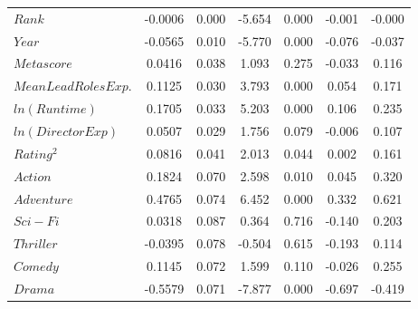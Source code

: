 \begin{table}[H]
\begin{center}
\begin{tabular}{lcccccc}
                        \textbf{$Rank$}                 & -0.0006       & 0.000            & -5.654     & 0.000               & -0.001          & -0.000          \\
                        \textbf{$Year$}                 & -0.0565       & 0.010            & -5.770     & 0.000               & -0.076          & -0.037          \\
                        \textbf{$Metascore$}            & 0.0416        & 0.038            & 1.093      & 0.275               & -0.033          & 0.116           \\
                        \textbf{$Mean Lead Roles Exp.$} & 0.1125        & 0.030            & 3.793      & 0.000               & 0.054           & 0.171           \\
                        \textbf{$ln(Runtime)$}          & 0.1705        & 0.033            & 5.203      & 0.000               & 0.106           & 0.235           \\
                        \textbf{$ln(Director Exp)$}     & 0.0507        & 0.029            & 1.756      & 0.079               & -0.006          & 0.107           \\
                        \textbf{$Rating^2$}             & 0.0816        & 0.041            & 2.013      & 0.044               & 0.002           & 0.161           \\
                        \textbf{$Action$}               & 0.1824        & 0.070            & 2.598      & 0.010               & 0.045           & 0.320           \\
                        \textbf{$Adventure$}            & 0.4765        & 0.074            & 6.452      & 0.000               & 0.332           & 0.621           \\
                        \textbf{$Sci-Fi$}               & 0.0318        & 0.087            & 0.364      & 0.716               & -0.140          & 0.203           \\
                        \textbf{$Thriller$}             & -0.0395       & 0.078            & -0.504     & 0.615               & -0.193          & 0.114           \\
                        \textbf{$Comedy$}               & 0.1145        & 0.072            & 1.599      & 0.110               & -0.026          & 0.255           \\
                        \textbf{$Drama$}                & -0.5579       & 0.071            & -7.877     & 0.000               & -0.697          & -0.419          \\

\end{tabular}
\end{center}
\end{table}
